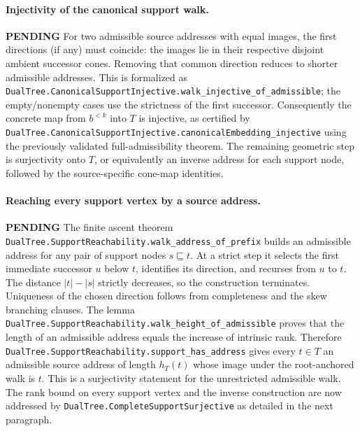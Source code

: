 \documentclass[11pt]{article}
\newcommand{\todo}{\textcolor{gray!70!black}{\textbf{PENDING}}}
\newcommand{\lean}[1]{\texttt{#1}}
\begin{document}
\paragraph{Injectivity of the canonical support walk.} \todo
For two admissible source addresses with equal images, the first
directions (if any) must coincide: the images lie in their respective
disjoint ambient successor cones.  Removing that common direction
reduces to shorter admissible addresses.  This is formalized as
\lean{DualTree.CanonicalSupportInjective.walk_injective_of_admissible};
the empty/nonempty cases use the strictness of the first successor.
Consequently the concrete map from $b^{<k}$ into $T$ is injective,
as certified by
\lean{DualTree.CanonicalSupportInjective.canonicalEmbedding_injective}
using the previously validated full-admissibility theorem.
The remaining geometric step is surjectivity onto $T$,
or equivalently an inverse address for each support node,
followed by the source-specific cone-map identities.


\paragraph{Reaching every support vertex by a source address.} \todo
The finite ascent theorem
\lean{DualTree.SupportReachability.walk_address_of_prefix}
builds an admissible address for any pair of support nodes $s\sqsubseteq t$.
At a strict step it selects the first immediate successor $u$ below
$t$, identifies its direction, and recurses from $u$ to $t$.
The distance $|t|-|s|$ strictly decreases, so the construction terminates.
Uniqueness of the chosen direction follows from completeness and
the skew branching clauses.  The lemma
\lean{DualTree.SupportReachability.walk_height_of_admissible}
proves that the length of an admissible address equals the increase
of intrinsic rank.  Therefore
\lean{DualTree.SupportReachability.support_has_address} gives every
$t\in T$ an admissible source address of length $h_T(t)$
whose image under the root-anchored walk is $t$.
This is a surjectivity statement for the unrestricted admissible walk.
The rank bound on every support vertex and the inverse construction
are now addressed by \lean{DualTree.CompleteSupportSurjective}
as detailed in the next paragraph.
\end{document}
